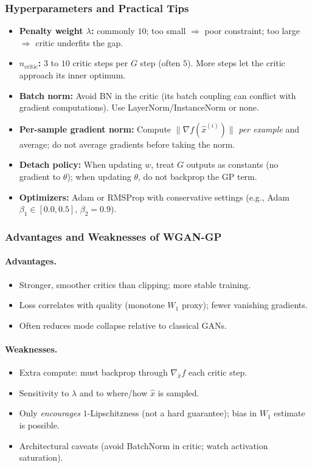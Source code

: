 \documentclass[11pt]{article}
\theoremstyle{remark}
\begin{document}
\subsubsection{Hyperparameters and Practical Tips}
\begin{itemize}
\item \textbf{Penalty weight $\lambda$:} commonly $10$; too small $\Rightarrow$ poor constraint; too large $\Rightarrow$ critic underfits the gap.
\item \textbf{$n_{\text{critic}}$:} $3$ to $10$ critic steps per $G$ step (often $5$). More steps let the critic approach its inner optimum.
\item \textbf{Batch norm:} Avoid BN in the critic (its batch coupling can conflict with gradient computations). Use LayerNorm/InstanceNorm or none.
\item \textbf{Per-sample gradient norm:} Compute $\|\nabla f(\hat{x}^{(i)})\|$ \emph{per example} and average; do not average gradients before taking the norm.
\item \textbf{Detach policy:} When updating $w$, treat $G$ outputs as constants (no gradient to $\theta$); when updating $\theta$, do not backprop the GP term.
\item \textbf{Optimizers:} Adam or RMSProp with conservative settings (e.g., Adam $\beta_1\!\in[0.0,0.5]$, $\beta_2\!=\!0.9$).
\end{itemize}

\subsubsection{Advantages and Weaknesses of WGAN-GP}
\paragraph{Advantages.}
\begin{itemize}
\item Stronger, smoother critics than clipping; more stable training.
\item Loss correlates with quality (monotone $W_1$ proxy); fewer vanishing gradients.
\item Often reduces mode collapse relative to classical GANs.
\end{itemize}

\paragraph{Weaknesses.}
\begin{itemize}
\item Extra compute: must backprop through $\nabla_{\hat{x}} f$ each critic step.
\item Sensitivity to $\lambda$ and to where/how $\hat{x}$ is sampled.
\item Only \emph{encourages} $1$-Lipschitzness (not a hard guarantee); bias in $W_1$ estimate is possible.
\item Architectural caveats (avoid BatchNorm in critic; watch activation saturation).
\end{itemize}
\end{document}
